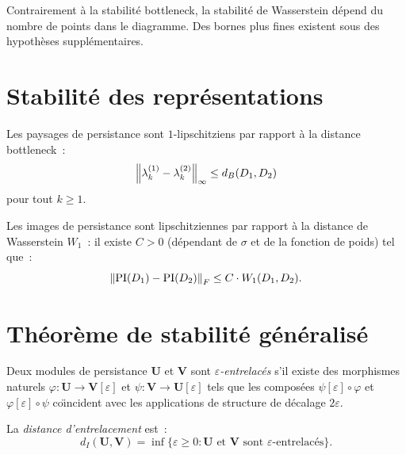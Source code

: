 \begin{remarque}
Contrairement \`a la stabilit\'e bottleneck, la stabilit\'e de Wasserstein
d\'epend du nombre de points dans le diagramme. Des bornes plus fines
existent sous des hypoth\`eses suppl\'ementaires.
\end{remarque}

\section{Stabilit\'e des repr\'esentations}

\begin{theoreme}
Les paysages de persistance sont $1$-lipschitziens par rapport \`a la
distance bottleneck~:
\[
  \left\| \lambda_k^{(1)} - \lambda_k^{(2)} \right\|_\infty
  \leq d_B(D_1, D_2)
\]
pour tout $k \geq 1$.
\end{theoreme}

\begin{proposition}
Les images de persistance sont lipschitziennes par rapport \`a la
distance de Wasserstein $W_1$~: il existe $C > 0$ (d\'ependant de
$\sigma$ et de la fonction de poids) tel que~:
\[
  \left\| \mathrm{PI}(D_1) - \mathrm{PI}(D_2) \right\|_F
  \leq C \cdot W_1(D_1, D_2).
\]
\end{proposition}

\section{Th\'eor\`eme de stabilit\'e g\'en\'eralis\'e}

\begin{definition}
Deux modules de persistance $\mathbf{U}$ et $\mathbf{V}$ sont
\emph{$\varepsilon$-entrelac\'es} s'il existe des morphismes naturels
$\varphi : \mathbf{U} \to \mathbf{V}[\varepsilon]$ et
$\psi : \mathbf{V} \to \mathbf{U}[\varepsilon]$ tels que les compos\'ees
$\psi[\varepsilon] \circ \varphi$ et $\varphi[\varepsilon] \circ \psi$
co\"{\i}ncident avec les applications de structure de d\'ecalage
$2\varepsilon$.

La \emph{distance d'entrelacement} est~:
\[
  d_I(\mathbf{U}, \mathbf{V}) = \inf\{\varepsilon \geq 0 :
  \mathbf{U} \text{ et } \mathbf{V} \text{ sont }
  \varepsilon\text{-entrelac\'es}\}.
\]
\end{definition}

